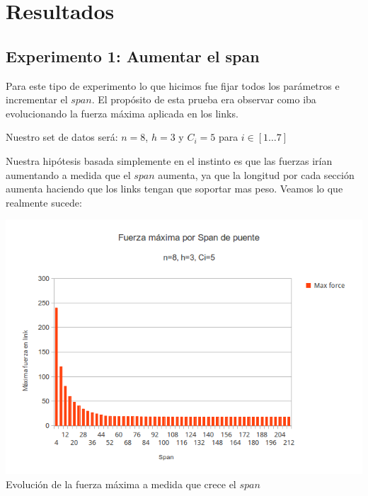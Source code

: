 \section{Resultados}

\subsection{Experimento 1: Aumentar el span}

Para este tipo de experimento lo que hicimos fue fijar todos los parámetros e incrementar el $span$. El propósito de esta prueba era observar como iba evolucionando la fuerza máxima aplicada en los links.

Nuestro set de datos será: $n = 8$, $h = 3$ y $C_i = 5$ para $i \in [1 \dots 7]$

Nuestra hipótesis basada simplemente en el instinto es que las fuerzas irían aumentando a medida que el $span$ aumenta, ya que la longitud por cada sección aumenta haciendo que los links tengan que soportar mas peso. Veamos lo que realmente sucede:

\begin{center}
\includegraphics[scale=0.8]{archivos/graficos/Fuerza-x-span.png}\\
Evolución de la fuerza máxima a medida que crece el $span$
\end{center}

